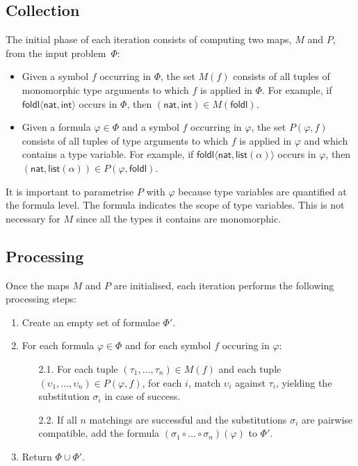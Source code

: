 \documentclass[]{ceurart}
\newcommand\ty[1]{\textsf{#1}}
\newcommand\sym[1]{\textsf{#1}}
\begin{document}
\subsection{Collection}
\label{ssec:collection}

The initial phase of each iteration consists of computing two maps, \(M\) and \(P\), from the input problem~$\Phi$:

\begin{itemize}
\item Given a symbol \(f\) occurring in \(\Phi\), the set \(M(f)\) consists of all tuples of monomorphic type arguments to which \(f\) is applied in \(\Phi\). For example, if \(\sym{foldl}\langle \ty{nat}, \ty{int}\rangle\) occurs in \(\Phi\), then \((\ty{nat}, \ty{int}) \in M(\sym{foldl}) \).

\item Given a formula \(\varphi \in \Phi\) and a symbol \(f\) occurring in \(\varphi\), the set \(P(\varphi, f)\) consists of all tuples of type arguments to which \(f\) is applied in \(\varphi\) and which contains a type variable. For example, if \(\sym{foldl}\langle \ty{nat}, \ty{list}(\alpha)\rangle\) occurs in \(\varphi\), then \((\ty{nat}, \ty{list}(\alpha)) \in P(\varphi, \sym{foldl}) \).
\end{itemize}

It is important to parametrise \(P\) with \(\varphi\) because type variables are quantified at the formula level. The formula indicates the scope of type variables. This is not necessary for \(M\) since all the types it contains are monomorphic.


\subsection{Processing}
\label{ssec:processing}

Once the maps \(M\) and \(P\) are initialised, each iteration performs the following processing steps:

\begin{enumerate}

   \item Create an empty set of formulae \(\Phi'\).

   \item For each formula \(\varphi \in \Phi\) and for each symbol \(f\) occuring in \(\varphi\):
   \begin{enumerate}
    \item[2.1.] For each tuple \((\tau_1, \dots, \tau_n) \in  M(f)\)        and each tuple \((\upsilon_1, \dots, \upsilon_n) \in P(\varphi, f)\),
     for each \(i\), match \(\upsilon_i\) against \(\tau_i\), yielding the substitution \(\sigma_i\) in case of success.

    \item[2.2.] If all \(n\) matchings are successful and the substitutions \(\sigma_i\) are pairwise compatible,
add the formula \((\sigma_1 \circ \dots \circ \sigma_n)(\varphi)\) to \(\Phi'\).
   \end{enumerate}

   \item Return \(\Phi \cup \Phi'\).

\end{enumerate}
\end{document}
